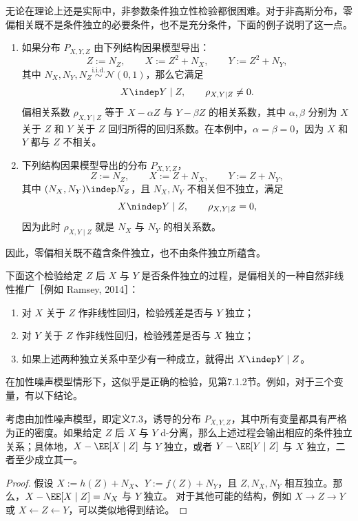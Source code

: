 无论在理论上还是实际中，非参数条件独立性检验都很困难。对于非高斯分布，零偏相关既不是条件独立的必要条件，也不是充分条件，下面的例子说明了这一点。

\begin{example}[条件独立与偏相关]
\begin{enumerate}[label=(\roman*)]
 \item 如果分布 $P_{X,Y,Z}$ 由下列结构因果模型导出：
 \[
  Z:=N_Z,\qquad X:=Z^2+N_X,\qquad Y:=Z^2+N_Y,
 \]
 其中 $N_X,N_Y,N_Z\overset{\mathrm{i.i.d.}}{\sim}\mathcal N(0,1)$，那么它满足
 \[
  X\indep Y\mid Z,\qquad \rho_{X,Y\mid Z}\neq0.
 \]
 偏相关系数 $\rho_{X,Y\mid Z}$ 等于 $X-\alpha Z$ 与 $Y-\beta Z$ 的相关系数，其中 $\alpha,\beta$ 分别为 $X$ 关于 $Z$ 和 $Y$ 关于 $Z$ 回归所得的回归系数。在本例中，$\alpha=\beta=0$，因为 $X$ 和 $Y$ 都与 $Z$ 不相关。
 \item 下列结构因果模型导出的分布 $P_{X,Y,Z}$，
 \[
  Z:=N_Z,\qquad X:=Z+N_X,\qquad Y:=Z+N_Y,
 \]
 其中 $(N_X,N_Y)\indep N_Z$，且 $N_X,N_Y$ 不相关但不独立，满足
 \[
  X\nindep Y\mid Z,\qquad \rho_{X,Y\mid Z}=0,
 \]
 因为此时 $\rho_{X,Y\mid Z}$ 就是 $N_X$ 与 $N_Y$ 的相关系数。
\end{enumerate}
因此，零偏相关既不蕴含条件独立，也不由条件独立所蕴含。
\end{example}

下面这个检验给定 $Z$ 后 $X$ 与 $Y$ 是否条件独立的过程，是偏相关的一种自然非线性推广［例如 Ramsey, 2014］：
\begin{enumerate}[label=(\arabic*)]
 \item 对 $X$ 关于 $Z$ 作非线性回归，检验残差是否与 $Y$ 独立；
 \item 对 $Y$ 关于 $Z$ 作非线性回归，检验残差是否与 $X$ 独立；
 \item 如果上述两种独立关系中至少有一种成立，就得出 $X\indep Y\mid Z$。
\end{enumerate}
在加性噪声模型情形下，这似乎是正确的检验，见第7.1.2节。例如，对于三个变量，有以下结论。

\begin{proposition}
考虑由加性噪声模型，即定义7.3，诱导的分布 $P_{X,Y,Z}$，其中所有变量都具有严格为正的密度。如果给定 $Z$ 后 $X$ 与 $Y$ d-分离，那么上述过程会输出相应的条件独立关系；具体地，$X-\EE[X\mid Z]$ 与 $Y$ 独立，或者 $Y-\EE[Y\mid Z]$ 与 $X$ 独立，二者至少成立其一。
\end{proposition}
\begin{proof}
假设 $X:=h(Z)+N_X$、$Y:=f(Z)+N_Y$，且 $Z,N_X,N_Y$ 相互独立。那么，$X-\EE[X\mid Z]=N_X$ 与 $Y$ 独立。
对于其他可能的结构，例如 $X\to Z\to Y$ 或 $X\leftarrow Z\leftarrow Y$，可以类似地得到结论。
\end{proof}

